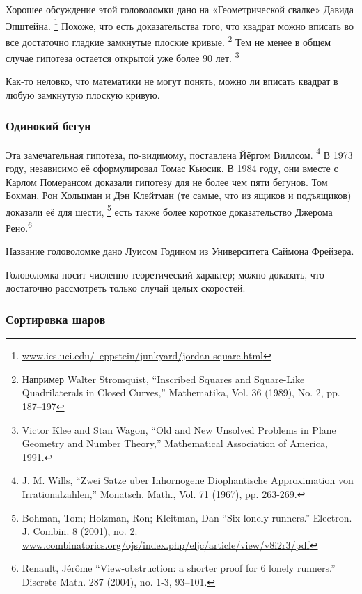Хорошее обсуждение этой головоломки дано на «Геометрической свалке» Давида Эпштейна.%
\footnote{\href{http://www.ics.uci.edu/~eppstein/junkyard/jordan-square.html}{www.ics.uci.edu/~eppstein/junkyard/jordan-square.html}}
Похоже, что есть доказательства того, что квадрат можно вписать во все достаточно гладкие замкнутые плоские кривые.%
\footnote{Например Walter Stromquist, ``Inscribed Squares and Square-Like Quadrilaterals in Closed Curves,'' Mathematika, Vol. 36 (1989), No. 2, pp. 187--197}
Тем не менее в общем случае гипотеза остается открытой уже более 90 лет.%
\footnote{Victor Klee and Stan Wagon, ``Old and New Unsolved Problems in Plane Geometry and Number Theory,'' Mathematical Association of America, 1991.}

\medskip

Как-то неловко, что математики не могут понять, можно ли вписать квадрат в любую замкнутую плоскую кривую.

\subsubsection*{Одинокий бегун}

Эта замечательная гипотеза, по-видимому, поставлена Йёргом Виллсом.%
\footnote{J. M. Wills, ``Zwei Satze uber Inhornogene Diophantische Approximation von Irrationalzahlen,'' Monatsch. Math., Vol. 71 (1967), pp. 263-269.}
В 1973 году, независимо её сформулировал Томас Кьюсик.
В 1984 году, они вместе с Карлом Померансом доказали гипотезу для не более чем пяти бегунов.
Том Бохман, Рон Хольцман и Дэн Клейтман (те самые, что из ящиков и подъящиков) доказали её для шести,%
\footnote{Bohman, Tom; Holzman, Ron; Kleitman, Dan
``Six lonely runners.''
Electron. J. Combin. 8 (2001), no. 2.\\
\href{https://www.combinatorics.org/ojs/index.php/eljc/article/view/v8i2r3/pdf}{www.combinatorics.org/ojs/index.php/eljc/article/view/v8i2r3/pdf}}
есть также более короткое доказательство Джерома Рено.\footnote{Renault, J\'{e}r\^{o}me ``View-obstruction: a shorter proof for 6 lonely runners.'' Discrete Math. 287 (2004), no. 1-3, 93--101.}

\medskip

Название головоломке дано Луисом Годином из Университета Саймона Фрейзера. %

Головоломка носит численно-теоретический характер;
можно доказать, что достаточно рассмотреть только случай целых скоростей.

\subsubsection*{Сортировка шаров}

